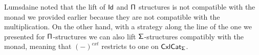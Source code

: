 
\begin{rmk}
  Lumsdaine noted that the lift of $\operatorname{\mathsf{Id}}$ and $\operatorname{\mathsf{\Pi}}$
  structures is not compatible with the monad we provided earlier because they
  are not compatible with the multiplication. On the other
  hand, with a strategy along the line of the one we presented for
  $\operatorname{\mathsf{\Pi}}$-structures we can also lift $\operatorname{\mathsf{\Sigma}}$-structures compatibly with the
  monad, meaning that $(-)^{cxt}$ restricts to one on $\operatorname{\mathsf{CxlCat}}_{\operatorname{\mathsf{\Sigma}}}$.
\end{rmk}
